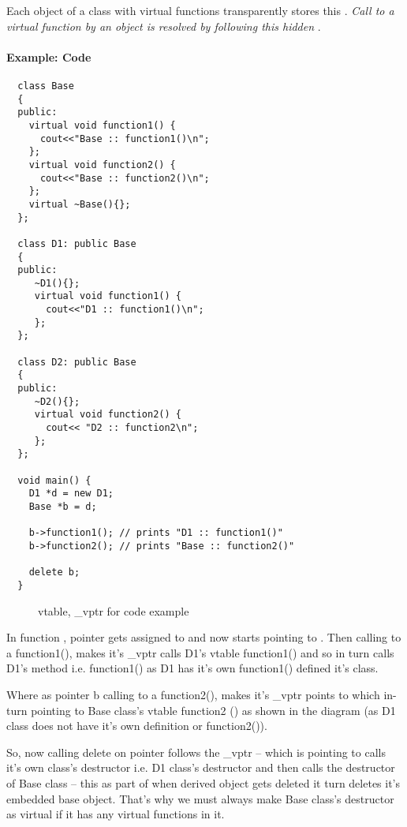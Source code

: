 \documentclass{memo}
\begin{document}
Each object of a class with virtual functions transparently stores this
. {\em Call to a virtual function by an object is resolved by following this
hidden \/}. 

\paragraph{Example: Code}
\begin{verbatim}
  class Base  
  {  
  public:  
    virtual void function1() {
      cout<<"Base :: function1()\n";
    };  
    virtual void function2() {
      cout<<"Base :: function2()\n";
    };  
    virtual ~Base(){};
  };  
   
  class D1: public Base  
  {  
  public:  
     ~D1(){};
     virtual void function1() { 
       cout<<"D1 :: function1()\n";
     };
  };  
  
  class D2: public Base  
  {  
  public:  
     ~D2(){};
     virtual void function2() { 
       cout<< "D2 :: function2\n";
     };  
  };  

  void main() {
    D1 *d = new D1;
    Base *b = d; 

    b->function1(); // prints "D1 :: function1()"
    b->function2(); // prints "Base :: function2()"
   
    delete b;
  }
\end{verbatim}

\begin{figure}
\begin{center}
\centerline{}
\end{center}
\caption{vtable, \_vptr for code example}
\end{figure}

In function ,  pointer gets assigned to  and
now starts pointing to . Then calling to a function1(), makes
it's \_vptr calls D1's vtable function1() and so in turn calls D1's method
i.e. function1() as D1 has it's own function1() defined it's class. 

Where as pointer b calling to a function2(), makes it's \_vptr points to
 which in-turn pointing to Base class's vtable function2 () as
shown in the diagram (as D1 class does not have it's own definition or function2()). 

So, now calling delete on pointer  follows the \_vptr -- which is
pointing to  calls it's own class's destructor i.e. D1 class's
destructor and then calls the destructor of Base class -- this as part of when
derived object gets deleted it turn deletes it's embedded base object. That's
why we must always make Base class's destructor as virtual if it has any
virtual functions in it. 
\end{document}
